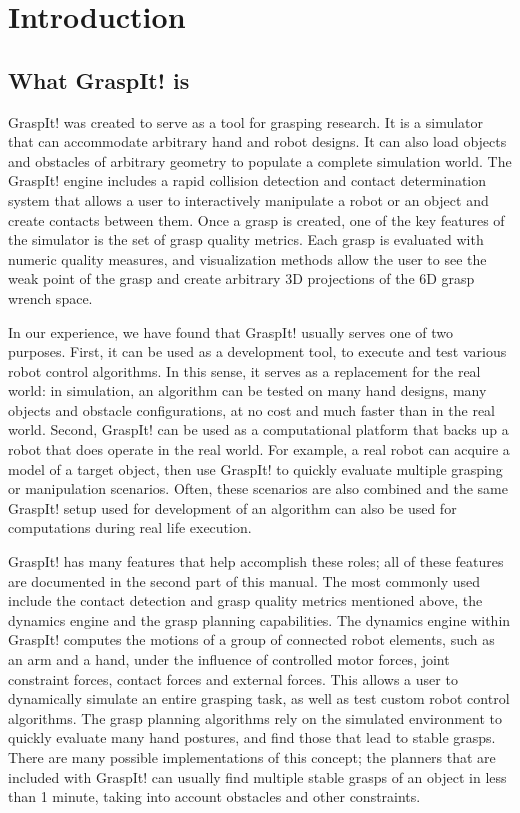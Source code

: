 \section{Introduction}


\subsection{What GraspIt! is}

GraspIt! was created to serve as a tool for grasping research. It is a
simulator that can accommodate arbitrary hand and robot designs. It
can also load objects and obstacles of arbitrary geometry to populate
a complete simulation world. The GraspIt! engine includes a rapid
collision detection and contact determination system that allows a
user to interactively manipulate a robot or an object and create
contacts between them. Once a grasp is created, one of the key
features of the simulator is the set of grasp quality metrics. Each
grasp is evaluated with numeric quality measures, and visualization
methods allow the user to see the weak point of the grasp and create
arbitrary 3D projections of the 6D grasp wrench space.

In our experience, we have found that GraspIt! usually serves one of
two purposes. First, it can be used as a development tool, to execute
and test various robot control algorithms. In this sense, it serves as
a replacement for the real world: in simulation, an algorithm can be
tested on many hand designs, many objects and obstacle configurations,
at no cost and much faster than in the real world. Second, GraspIt!
can be used as a computational platform that backs up a robot that
does operate in the real world. For example, a real robot can acquire a
model of a target object, then use GraspIt! to quickly evaluate
multiple grasping or manipulation scenarios. Often, these scenarios
are also combined and the same GraspIt! setup used for development of
an algorithm can also be used for computations during real life
execution.

GraspIt! has many features that help accomplish these roles; all of
these features are documented in the second part of this manual. The
most commonly used include the contact detection and grasp quality
metrics mentioned above, the dynamics engine and the grasp planning
capabilities. The dynamics engine within GraspIt! computes the motions
of a group of connected robot elements, such as an arm and a hand,
under the influence of controlled motor forces, joint constraint
forces, contact forces and external forces. This allows a user to
dynamically simulate an entire grasping task, as well as test custom
robot control algorithms. The grasp planning algorithms rely on the
simulated environment to quickly evaluate many hand postures, and
find those that lead to stable grasps. There are many possible
implementations of this concept; the planners that are included with
GraspIt! can usually find multiple stable grasps of an object in less
than 1 minute, taking into account obstacles and other constraints.

